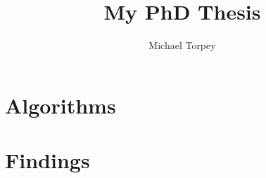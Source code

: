 \documentclass[a4paper]{report}
\title{My PhD Thesis}
\author{Michael Torpey}
\theoremstyle{definition}
\begin{document}
\maketitle

\tableofcontents

\doublespacing





\part{Algorithms}
\label{part:algorithms}




\part{Findings}
\label{part:findings}






\end{document}
